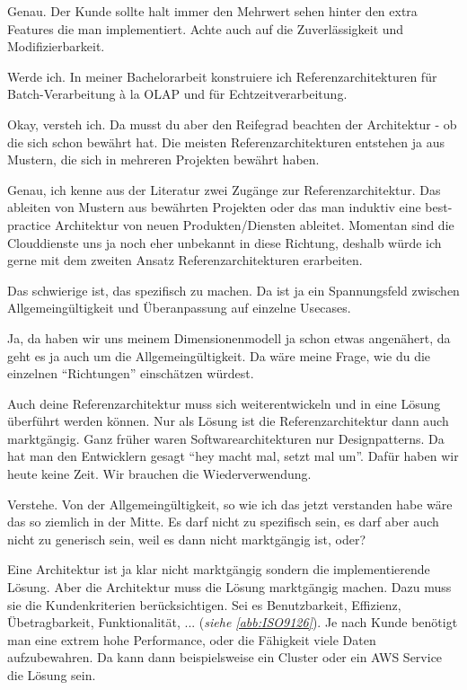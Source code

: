 \RB Genau. Der Kunde sollte halt immer den Mehrwert sehen hinter den extra Features die man implementiert. Achte auch auf die Zuverlässigkeit und Modifizierbarkeit. 

\LF Werde ich. In meiner Bachelorarbeit konstruiere ich Referenzarchitekturen für Batch-Verarbeitung \`{a} la \ac{OLAP} und für Echtzeitverarbeitung.

\RB Okay, versteh ich. Da musst du aber den Reifegrad beachten der Architektur - ob die sich schon bewährt hat. Die meisten Referenzarchitekturen entstehen ja aus Mustern, die sich in mehreren Projekten bewährt haben.

\LF Genau, ich kenne aus der Literatur zwei Zugänge zur Referenzarchitektur. Das ableiten von Mustern aus bewährten Projekten oder das man induktiv eine best-practice Architektur von neuen Produkten/Diensten ableitet. Momentan sind die Clouddienste uns ja noch eher unbekannt in diese Richtung, deshalb würde ich gerne mit dem zweiten Ansatz Referenzarchitekturen erarbeiten.

\RB Das schwierige ist, das spezifisch zu machen. Da ist ja ein Spannungsfeld zwischen Allgemeingültigkeit und Überanpassung auf einzelne Usecases.

\LF Ja, da haben wir uns meinem Dimensionenmodell ja schon etwas angenähert, da geht es ja auch um die Allgemeingültigkeit. Da wäre meine Frage, wie du die einzelnen \enquote{Richtungen} einschätzen würdest.

\RB Auch deine Referenzarchitektur muss sich weiterentwickeln und in eine Lösung überführt werden können. Nur als Lösung ist die Referenzarchitektur dann auch marktgängig. Ganz früher waren Softwarearchitekturen nur Designpatterns. Da hat man den Entwicklern gesagt \enquote{hey macht mal, setzt mal um}. Dafür haben wir heute keine Zeit. Wir brauchen die Wiederverwendung. 

\LF Verstehe. Von der Allgemeingültigkeit, so wie ich das jetzt verstanden habe wäre das so ziemlich in der Mitte. Es darf nicht zu spezifisch sein, es darf aber auch nicht zu generisch sein, weil es dann nicht marktgängig ist, oder?

\RB Eine Architektur ist ja klar nicht marktgängig sondern die implementierende Lösung. Aber die Architektur muss die Lösung marktgängig machen. Dazu muss sie die Kundenkriterien berücksichtigen. Sei es Benutzbarkeit, Effizienz, Übetragbarkeit, Funktionalität, ... (\textit{siehe \autoref{abb:ISO9126}}). Je nach Kunde benötigt man eine extrem hohe Performance, oder die Fähigkeit viele Daten aufzubewahren. Da kann dann beispielsweise ein Cluster oder ein \ac{AWS} Service die Lösung sein.


